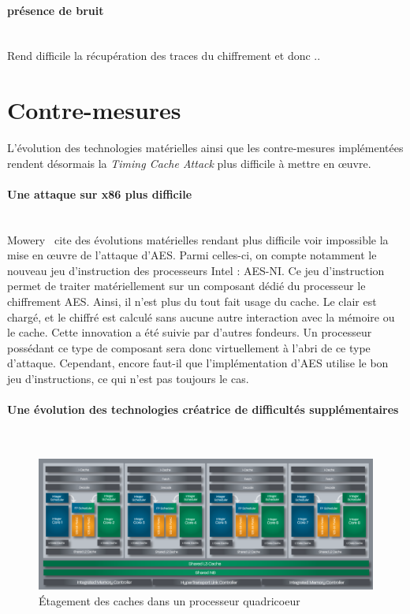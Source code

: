 \documentclass[a4paper,11pt]{article}
\begin{document}
\paragraph{présence de bruit}~\\
Rend difficile la récupération des traces du chiffrement et donc .. %

\section{Contre-mesures}
L'évolution des technologies matérielles ainsi que les contre-mesures implémentées rendent désormais la \emph{Timing Cache Attack} plus difficile à mettre en \oe uvre. 

\paragraph{Une attaque sur x86 plus difficile}~\\
Mowery~\cite{mowery2012aes} cite des évolutions matérielles rendant plus difficile voir impossible la mise en œuvre de l'attaque d'AES. Parmi celles-ci, on compte notamment le nouveau jeu d'instruction des processeurs Intel : AES-NI. Ce jeu d'instruction permet de traiter matériellement sur un composant dédié du processeur le chiffrement AES. Ainsi, il n'est plus du tout fait usage du cache. Le clair est chargé, et le chiffré est calculé sans aucune autre interaction avec la mémoire ou le cache.
Cette innovation a été suivie par d'autres fondeurs. Un processeur possédant ce type de composant sera donc virtuellement à l'abri de ce type d'attaque. Cependant, encore faut-il que l'implémentation d'AES utilise le bon jeu d'instructions, ce qui n'est pas toujours le cas.

\paragraph{Une évolution des technologies créatrice de difficultés supplémentaires}~\\

\begin{figure}[h]
  \centering
  \includegraphics[width=14cm]{figures/BDArch.png}
  \caption{Étagement des caches dans un processeur quadricoeur}
  \label{etagement} 
\end{figure}
\end{document}
